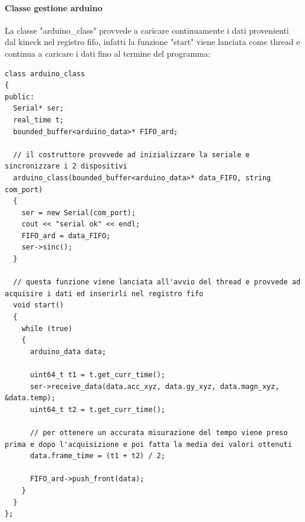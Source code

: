 \documentclass[10pt,a4paper]{article}
\begin{document}
\paragraph{Classe gestione arduino}
La classe "arduino\_class" provvede a caricare continuamente i dati provenienti dal kineck nel registro fifo, infatti la funzione "start" viene lanciata come thread e continua a caricare i dati fino al termine del programma:
\begin{lstlisting}[style=mycpp, caption=classe arduino\_class, captionpos=b]
class arduino_class
{
public:
  Serial* ser;
  real_time t;
  bounded_buffer<arduino_data>* FIFO_ard;

  // il costruttore provvede ad inizializzare la seriale e sincronizzare i 2 dispositivi
  arduino_class(bounded_buffer<arduino_data>* data_FIFO, string com_port)
  {
    ser = new Serial(com_port);
    cout << "serial ok" << endl;
    FIFO_ard = data_FIFO;
    ser->sinc();
  }

  // questa funzione viene lanciata all'avvio del thread e provvede ad acquisire i dati ed inserirli nel registro fifo
  void start()
  {
    while (true)
    {
      arduino_data data;
      
      uint64_t t1 = t.get_curr_time();
      ser->receive_data(data.acc_xyz, data.gy_xyz, data.magn_xyz, &data.temp);
      uint64_t t2 = t.get_curr_time();

	  // per ottenere un accurata misurazione del tempo viene preso prima e dopo l'acquisizione e poi fatta la media dei valori ottenuti
      data.frame_time = (t1 + t2) / 2;

      FIFO_ard->push_front(data);
    }
  }
};
\end{lstlisting}
%
%
\end{document}
